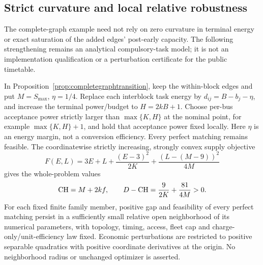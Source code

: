 \subsection{Strict curvature and local relative robustness}
\label{app:stricttransitionrobustness}
The complete-graph example need not rely on zero curvature in terminal
energy or exact saturation of the added edges' post-early capacity.
The following strengthening remains an analytical compulsory-task model;
it is not an implementation qualification or a perturbation certificate
for the public timetable.

\begin{proposition}
\label{prop:stricttransitionrobustness}
In Proposition~\ref{prop:completegraphtransition}, keep the within-block
edges and put $M=S_{\max}$, $\eta=1/4$. Replace each interblock task
energy by $d_{ij}=B-b_j-\eta$, and increase the terminal power/budget to
$H=2kB+1$. Choose per-bus acceptance power strictly larger than
$\max\{K,H\}$ at the nominal point, for example $\max\{K,H\}+1$,
and hold that acceptance power fixed locally. Here $\eta$ is an energy
margin, not a conversion efficiency.
Every perfect matching remains feasible. The coordinatewise strictly
increasing, strongly convex supply objective
\[
 F(E,L)=3E+L+\frac{(E-3)^2}{2K}
             +\frac{(L-(M-9))^2}{4M}
\]
gives the whole-problem values
\[
 \mathrm{CH}=M+2kf,\qquad
 D-\mathrm{CH}=\frac{9}{2K}+\frac{81}{4M}>0.
\]
For each fixed finite family member, positive gap and feasibility of every
perfect matching persist in a sufficiently small relative open
neighborhood of its numerical parameters, with topology, timing, access,
fleet cap and charge-only/unit-efficiency law fixed. Economic perturbations
are restricted to positive separable quadratics with positive coordinate
derivatives at the origin. No neighborhood radius or unchanged optimizer
is asserted.
\end{proposition}


